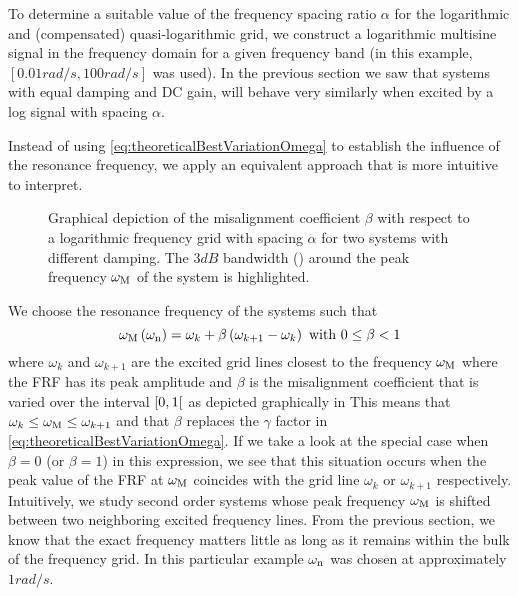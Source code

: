   To determine a suitable value of the frequency spacing ratio $\alpha$ for the logarithmic and (compensated) quasi-logarithmic grid, we construct a logarithmic multisine signal in the frequency domain for a given frequency band (in this example, $\left[ 0.01 \unit{rad/s}, 100 \unit{rad/s}\right]$ was used).
  In the previous section we saw that systems with equal damping and DC gain, will behave very similarly when excited by a log signal with spacing $\alpha$.

  Instead of using \eqref{eq:theoreticalBestVariationOmega} to establish the influence of the resonance frequency, we apply an equivalent approach that is more intuitive to interpret.


  \begin{figure}
    \centering
    \setlength\figureheight{5cm}
    \setlength{}
    
    \caption[Depiction of the grid misalignment $\beta$ for a logarithmic generalized multisine.]{Graphical depiction of the misalignment coefficient $\beta$ with respect to a logarithmic frequency grid with spacing $\alpha$ for two systems with different damping.
    The $3\unit{dB}$ bandwidth (\sysBW) around the peak frequency $\omega_{\mathrm{M}}$ of the system is highlighted.}
    \label{fig:misalignment-logms}
  \end{figure}


  We choose the resonance frequency of the systems such that
  \begin{equation}
   \omega_{\mathrm{M}}\left( \omega_{\mathrm{n}} \right)  = \omega_k + \beta \left( \omega_{k+1} - \omega_k \right)
   \text{ with } 0 \leq \beta < 1
   \label{eq:chosenVariationOmega}
  \end{equation}
  where $\omega_k$ and $\omega_{k+1}$ are the excited grid lines closest to the frequency $\omega_{\mathrm{M}}$ where the FRF has its peak amplitude and $\beta$ is the misalignment coefficient that is varied over the interval $\left[ 0,1 \right[$ as depicted graphically in 
  This means that $\omega_k \leq \omega_{\mathrm{M}} \leq \omega_{k+1}$ and that $\beta$ replaces the $\gamma$ factor in \eqref{eq:theoreticalBestVariationOmega}.
  If we take a look at the special case when $\beta=0$ (or $\beta=1$) in this expression, we see that this situation occurs when the peak value of the FRF at $\omega_{\mathrm{M}}$ coincides with the grid line $\omega_k$ or $\omega_{k+1}$ respectively.
  Intuitively, we study second order systems whose peak frequency $\omega_{\mathrm{M}}$ is shifted between two neighboring excited frequency lines.
  From the previous section, we know that the exact frequency matters little as long as it remains within the bulk of the frequency grid.
  In this particular example $\omega_{\mathrm{n}}$ was chosen at approximately $1 \unit{rad/s}$.

